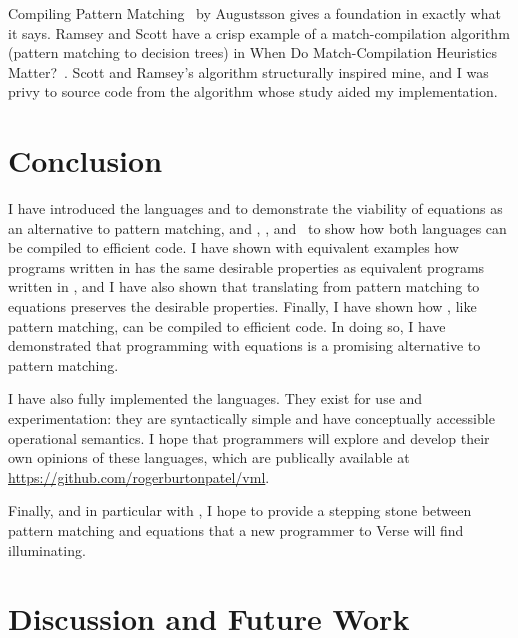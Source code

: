 \documentclass[manuscript,screen,review, 12pt, nonacm]{acmart}
\begin{document}
    Compiling Pattern Matching~\citep{augustsson1985compiling} by Augustsson
    gives a foundation in exactly what it says. Ramsey and Scott have a crisp
    example of a match-compilation algorithm (pattern matching to decision
    trees) in When Do Match-Compilation Heuristics Matter?~\citep{scottramsey}.
    Scott and Ramsey's algorithm structurally inspired mine, and I was privy to
    source code from the algorithm whose study aided my implementation. 
    
    
    \section{Conclusion}

    I have introduced the languages \PPlus and \VMinus to demonstrate the
    viability of equations as an alternative to pattern matching, and \D,
    \PtoVTran, and \DTran\ to show how both languages can be compiled to
    efficient code. I have shown with equivalent examples how programs written
    in \VMinus has the same desirable properties as equivalent programs written
    in \PPlus, and I have also shown that translating from pattern matching to
    equations preserves the desirable properties. Finally, I have shown how
    \VMinus, like pattern matching, can be compiled to efficient code. In doing
    so, I have demonstrated that programming with equations is a promising
    alternative to pattern matching. 

    I have also fully implemented the languages. They exist for use and
    experimentation: they are syntactically simple and have conceptually
    accessible operational semantics. I hope that programmers will explore and
    develop their own opinions of these languages, which are publically
    available at \url{https://github.com/rogerburtonpatel/vml}. 

    Finally, and in particular with \VMinus, I hope to provide a stepping stone
    between pattern matching and equations that a new programmer to Verse will
    find illuminating. 
    
    
    \section{Discussion and Future Work}        
    \label{futurework}
\end{document}
